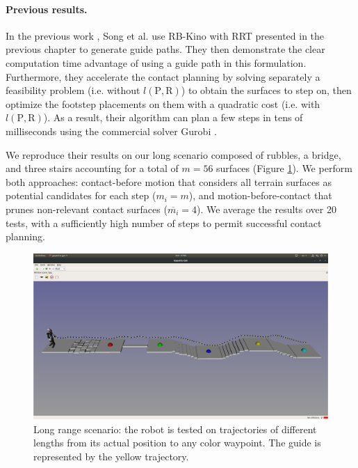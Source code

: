 
\paragraph{Previous results.\label{par:mip:prev_res_sl1m}}
In the previous work \cite{sl1m_v2}, Song et al. use RB-Kino with RRT \cite{kinodynamic_sm_2017} presented in the previous chapter to generate guide paths.
They then demonstrate the clear computation time advantage of using a guide path in this formulation.
Furthermore, they accelerate the contact planning by solving separately a feasibility problem (i.e. without $l(\mbox{P},\mbox{R})$) to obtain the surfaces to step on, then optimize the footstep placements on them with a quadratic cost (i.e. with $l(\mbox{P},\mbox{R})$).
As a result, their algorithm can plan a few steps in tens of milliseconds using the commercial solver Gurobi \cite{gurobi}.

We reproduce their results on our long scenario composed of rubbles, a bridge, and three stairs accounting for a total of $m=56$ surfaces (Figure \ref{fig:mip:long_range_mbc_cmb}).
We perform both approaches: contact-before motion that considers all terrain surfaces as potential candidates for each step ($m_i=m$), and motion-before-contact that prunes non-relevant contact surfaces ($\overline{m_i}=4$).
We average the results over 20 tests, with a  sufficiently high number of steps to permit successful contact planning.

\begin{figure}[ht]
    \captionsetup[subfigure]{justification=centering}
    \centering
    \includegraphics[trim={1cm 12cm 1cm 15cm}, clip,width=\textwidth]{Figures/Chapter_MIP_SL1M/long_all.png}
    \caption{Long range scenario: the robot is tested on trajectories of different lengths from its actual position to any color waypoint. The guide is represented by the yellow trajectory.}
    \label{fig:mip:long_range_mbc_cmb}
\end{figure}

